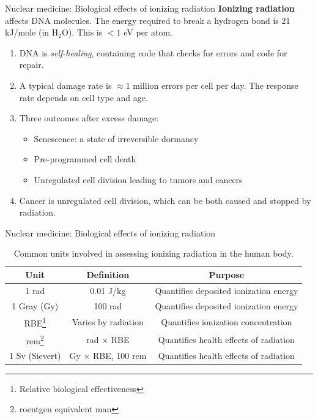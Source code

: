 \documentclass{beamer}
\begin{document}
\begin{frame}{Nuclear medicine: Biological effects of ionizing radiation}
\small
\alert{\textbf{Ionizing radiation}} affects DNA molecules.  The energy required to break a hydrogen bond is 21 kJ/mole (in H$_2$O). This is $<1$ eV per atom.
\begin{enumerate}
\item DNA is \textit{self-healing}, containing code that checks for errors and code for repair.
\item A typical damage rate is $\approx 1$ million errors per cell per day.  The response rate depends on cell type and age.
\item Three outcomes after excess damage:
\begin{itemize}
\item Senescence: a state of irreversible dormancy
\item Pre-programmed cell death
\item Unregulated cell division leading to tumors and cancers
\end{itemize}
\item Cancer is unregulated cell division, which can be both caused and stopped by radiation.
\end{enumerate}
\end{frame}

\begin{frame}{Nuclear medicine: Biological effects of ionizing radiation}
\begin{table}
\footnotesize
\centering
\begin{tabular}{| c | c | c |}
\hline
\textbf{Unit} & \textbf{Definition} & \textbf{Purpose} \\ \hline
1 rad & 0.01 J/kg & Quantifies deposited ionization energy \\ \hline
1 Gray (Gy) & 100 rad & Quantifies deposited ionization energy \\ \hline
RBE\footnote{Relative biological effectiveness} & Varies by radiation & Quantifies ionization concentration \\ \hline
rem\footnote{roentgen equivalent man} & rad $\times$ RBE & Quantifies health effects of radiation \\ \hline
1 Sv (Sievert) & Gy $\times$ RBE, 100 rem & Quantifies health effects of radiation \\ \hline
\end{tabular}
\caption{\label{tab:rad_units} \footnotesize Common units involved in assessing ionizing radiation in the human body.}
\end{table}
\end{frame}
\end{document}
